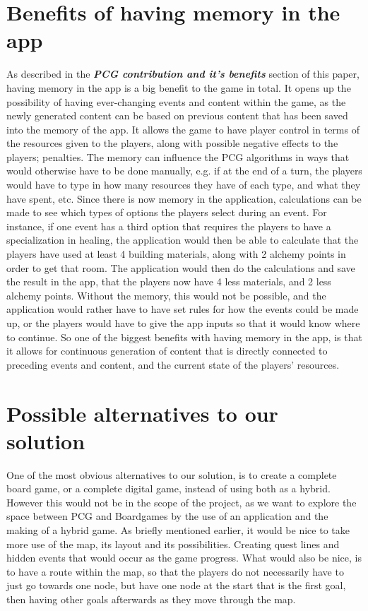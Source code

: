 \section{Benefits of having memory in the app}
As described in the \textit{\textbf{PCG contribution and it's benefits}} section of this paper, having memory in the app is a big benefit to the game in total.
It opens up the possibility of having ever-changing events and content within the game, as the newly generated content can be based on previous content that has been saved into the memory of the app.
It allows the game to have player control in terms of the resources given to the players, along with possible negative effects to the players; penalties. The memory can influence the PCG algorithms in ways that would otherwise have to be done manually, e.g. if at the end of a turn, the players would have to type in how many resources they have of each type, and what they have spent, etc.
Since there is now memory in the application, calculations can be made to see which types of options the players select during an event. For instance, if one event has a third option that requires the players to have a specialization in healing, the application would then be able to calculate that the players have used at least 4 building materials, along with 2 alchemy points in order to get that room. The application would then do the calculations and save the result in the app, that the players now have 4 less materials, and 2 less alchemy points. Without the memory, this would not be possible, and the application would rather have to have set rules for how the events could be made up, or the players would have to give the app inputs so that it would know where to continue.
So one of the biggest benefits with having memory in the app, is that it allows for continuous generation of content that is directly connected to preceding events and content, and the current state of the players' resources.

\section{Possible alternatives to our solution}
One of the most obvious alternatives to our solution, is to create a complete board game, or a complete digital game, instead of using both as a hybrid. However this would not be in the scope of the project, as we want to explore the space between PCG and Boardgames by the use of an application and the making of a hybrid game.
As briefly mentioned earlier, it would be nice to take more use of the map, its layout and its possibilities. Creating quest lines and hidden events that would occur as the game progress. What would also be nice, is to have a route within the map, so that the players do not necessarily have to just go towards one node, but have one node at the start that is the first goal, then having other goals afterwards as they move through the map. 

